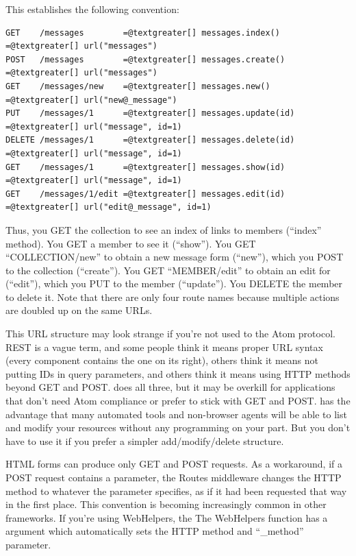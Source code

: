 \documentclass[letterpaper,10pt,english]{manual}
\begin{document}
This establishes the following convention:

\begin{Verbatim}[commandchars=@\[\]]
GET    /messages        =@textgreater[] messages.index()    =@textgreater[] url("messages")
POST   /messages        =@textgreater[] messages.create()   =@textgreater[] url("messages")
GET    /messages/new    =@textgreater[] messages.new()      =@textgreater[] url("new@_message")
PUT    /messages/1      =@textgreater[] messages.update(id) =@textgreater[] url("message", id=1)
DELETE /messages/1      =@textgreater[] messages.delete(id) =@textgreater[] url("message", id=1)
GET    /messages/1      =@textgreater[] messages.show(id)   =@textgreater[] url("message", id=1)
GET    /messages/1/edit =@textgreater[] messages.edit(id)   =@textgreater[] url("edit@_message", id=1)
\end{Verbatim}

Thus, you GET the collection to see an index of links to members (``index''
method).  You GET a member to see it (``show'').  You GET ``COLLECTION/new'' to
obtain a new message form (``new''), which you POST to the collection (``create'').
You GET ``MEMBER/edit'' to obtain an edit for (``edit''), which you PUT to the
member (``update'').  You DELETE the member to delete it.  Note that there are
only four route names because multiple actions are doubled up on the same URLs.

This URL structure may look strange if you're not used to the Atom protocol.
REST is a vague term, and some people think it means proper URL syntax (every
component contains the one on its right), others think it means not putting IDs
in query parameters, and others think it means using HTTP methods beyond GET
and POST.   does all three, but it may be overkill for
applications that don't need Atom compliance or prefer to stick with GET and
POST.   has the advantage that many automated tools and
non-browser agents will be able to list and modify your resources without any
programming on your part.  But you don't have to use it if you prefer a simpler
add/modify/delete structure.

HTML forms can produce only GET and POST requests.  As a workaround, if a POST
request contains a  parameter, the Routes middleware changes the
HTTP method to whatever the parameter specifies, as if it had been requested
that way in the first place.  This convention is becoming increasingly common
in other frameworks.  If you're using WebHelpers, the The WebHelpers 
function has a  argument which automatically sets the HTTP method and
``\_method'' parameter.
\end{document}
